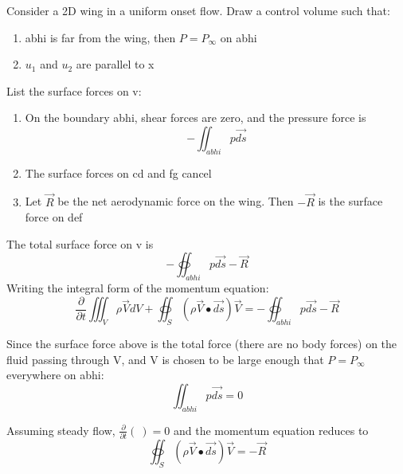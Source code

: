 \documentclass[draft=false, titlepage]{article}
\newcommand{\deldelt}{\frac{\partial}{\partial t}}
\newcommand{\volumeint}{\iiint_V}
\begin{document}
Consider a 2D wing in a uniform onset flow. Draw a control volume such that:
\begin{enumerate}
\item abhi is far from the wing, then $P=P_\infty$ on abhi
\item $u_1$ and $u_2$ are parallel to x
\end{enumerate}
List the surface forces on v:
\begin{enumerate}
    \item On the boundary abhi, shear forces are zero, and the pressure force is
\begin{equation*}
    -\iint_{abhi} p \vec{ds}
\end{equation*}
\item The surface forces on cd and fg cancel
\item Let $\vec{R}$ be the net aerodynamic force on the wing. Then $-\vec{R}$ is the surface force on def
\end{enumerate}

The total surface force on v is
\begin{equation*}
-\oiint_{abhi} p \vec{ds} - \vec{R}
\end{equation*}
Writing the integral form of the momentum equation:
\begin{equation*}
    \deldelt \volumeint\rho \vec{V} dV + \oiint_S (\rho \vec{V} \bullet \vec{ds}) \vec{V} = -\oiint_{abhi} p\vec{ds} - \vec{R}
\end{equation*}

Since the surface force above is the total force (there are no body forces) on the fluid passing through V, and V is chosen to be large enough that $P=P_\infty$ everywhere on abhi:
\begin{equation*}
    \iint_{abhi} p \vec{ds} = 0
\end{equation*}

Assuming steady flow, $\deldelt(~) = 0$ and the momentum equation reduces to
\begin{equation*}
    \oiint_S (\rho \vec{V} \bullet\vec{ds})\vec{V} = -\vec{R}
\end{equation*}
\end{document}
